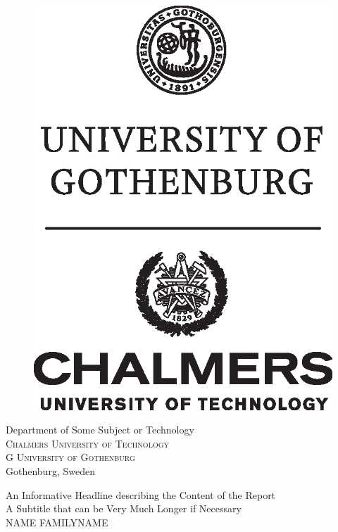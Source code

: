 \begin{center}
\begin{figure}[H]
        \includegraphics[width=0.3\pdfpagewidth]{figure/auxiliary/chalmers_gu_black_centered_eng.eps} \\
        \fi
    \end{figure}
    \vspace{5mm}
    Department of Some Subject or Technology \\
    \textsc{Chalmers University of Technology} \\
    \if\InstitutionLocation G
    \textsc{University of Gothenburg} \\
    \fi
    Gothenburg, Sweden \the\year \\
\end{center}


\newpage
\thispagestyle{plain}
\vspace*{4.5cm}
An Informative Headline describing the Content of the Report\\
A Subtitle that can be Very Much Longer if Necessary\\
NAME FAMILYNAME \setlength{\parskip}{1cm}

